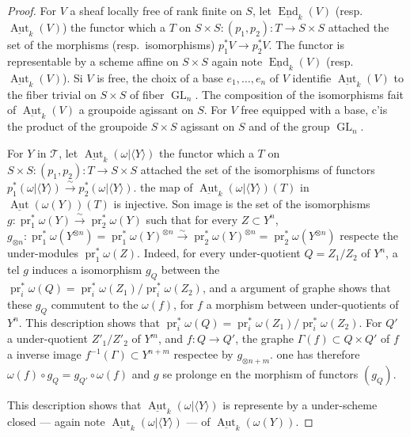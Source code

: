 \documentclass[12pt,a4paper]{article}
\theoremstyle{plain}
\theoremstyle{definition}
\DeclareMathOperator{\End}{End}
\DeclareMathOperator{\Aut}{Aut}
\DeclareMathOperator{\pr}{pr}
\DeclareMathOperator{\GL}{GL}
\begin{document}
\begin{proof}
For $V$ a sheaf locally free of rank finite on $S$, let $\underline{\End}_k(V)$ (resp.~$\underline{\Aut}_k(V)$) the functor which a $T$ on $S \times S : (p_1, p_2) : T \to S \times S$ attached the set of the morphisms (resp.~isomorphisms) $p_1^*V \to p_2^*V$. The functor is representable by a scheme affine on $S \times S$ again note $\underline{\End}_k(V)$ (resp.~$\underline{\Aut}_k(V)$). Si $V$ is free, the choix of a base $e_1, \ldots, e_n$ of $V$ identifie $\underline{\Aut}_k(V)$ to the fiber trivial on $S \times S$ of fiber $\GL_n$. The composition of the isomorphisms fait of $\underline{\Aut}_k(V)$ a groupoide agissant on $S$. For $V$ free equipped with a base, c'is the product of the groupoide $S \times S$ agissant on $S$ and of the group $\GL_n$.

For $Y$ in $\mathcal{T}$, let $\underline{\Aut}_k(\omega|\langle Y \rangle)$ the functor which a $T$ on $S \times S : (p_1, p_2) : T \to S \times S$ attached the set of the isomorphisms of functors $p_1^*(\omega|\langle Y \rangle) \xrightarrow{\sim} p_2^*(\omega|\langle Y \rangle)$. the map of $\underline{\Aut}_k(\omega|\langle Y \rangle)(T)$ in $\underline{\Aut}(\omega(Y))(T)$ is injective. Son image is the set of the isomorphisms $g : \pr_1^*\omega(Y) \xrightarrow{\sim} \pr_2^*\omega(Y)$ such that for every $Z \subset Y^n$, $g_{\otimes n} : \pr_1^*\omega(Y^{\otimes n}) = \pr_1^*\omega(Y)^{\otimes n} \xrightarrow{\sim} \pr_2^*\omega(Y)^{\otimes n} = \pr_2^*\omega(Y^{\otimes n})$ respecte the under-modules $\pr_1^*\omega(Z)$. Indeed, for every under-quotient $Q = Z_1/Z_2$ of $Y^n$, a tel $g$ induces a isomorphism $g_Q$ between the $\pr_i^*\omega(Q) = \pr_i^*\omega(Z_1)/\pr_i^*\omega(Z_2)$, and a argument of graphe shows that these $g_Q$ commutent to the $\omega(f)$, for $f$ a morphism between under-quotients of $Y^n$. This description shows that $\pr_i^*\omega(Q) = \pr_i^*\omega(Z_1)/\pr_i^*\omega(Z_2)$. For $Q'$ a under-quotient $Z'_1/Z'_2$ of $Y^m$, and $f : Q \to Q'$, the graphe $\Gamma(f) \subset Q \times Q'$ of $f$ a inverse image $f^{-1}(\Gamma) \subset Y^{n+m}$ respectee by $g_{\otimes n+m}$. one has therefore $\omega(f) \circ g_Q = g_{Q'} \circ \omega(f)$ and $g$ se prolonge en the morphism of functors $(g_Q)$.

This description shows that $\underline{\Aut}_k(\omega|\langle Y \rangle)$ is represente by a under-scheme closed --- again note $\underline{\Aut}_k(\omega|\langle Y \rangle)$ --- of $\underline{\Aut}_k(\omega(Y))$.


\end{proof}
\end{document}
